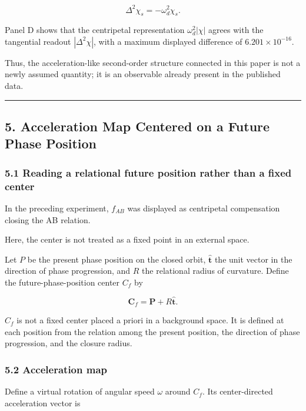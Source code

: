 \documentclass[
  10pt,
  a4paper,
]{article}
\begin{document}
\[
\Delta^2\chi_s=-\omega_d^2\chi_s.
\]

Panel D shows that the centripetal representation \(\omega_d^2|\chi|\)
agrees with the tangential readout \(|\Delta^2\chi|\), with a maximum
displayed difference of \(6.201\times10^{-16}\).

Thus, the acceleration-like second-order structure connected in this
paper is not a newly assumed quantity; it is an observable already
present in the published data.

\begin{center}\rule{0.5\linewidth}{0.5pt}\end{center}

\subsection{5. Acceleration Map Centered on a Future Phase
Position}\label{acceleration-map-centered-on-a-future-phase-position}

\subsubsection{5.1 Reading a relational future position rather than a
fixed
center}\label{reading-a-relational-future-position-rather-than-a-fixed-center}

In the preceding experiment, \(f_{AB}\) was displayed as centripetal
compensation closing the AB relation.

Here, the center is not treated as a fixed point in an external space.

Let \(P\) be the present phase position on the closed orbit,
\(\hat{\boldsymbol t}\) the unit vector in the direction of phase
progression, and \(R\) the relational radius of curvature. Define the
future-phase-position center \(C_f\) by

\[
\boldsymbol C_f
=\boldsymbol P+R\hat{\boldsymbol t}.
\]

\(C_f\) is not a fixed center placed a priori in a background space. It
is defined at each position from the relation among the present
position, the direction of phase progression, and the closure radius.

\subsubsection{5.2 Acceleration map}\label{acceleration-map}

Define a virtual rotation of angular speed \(\omega\) around \(C_f\).
Its center-directed acceleration vector is
\end{document}
